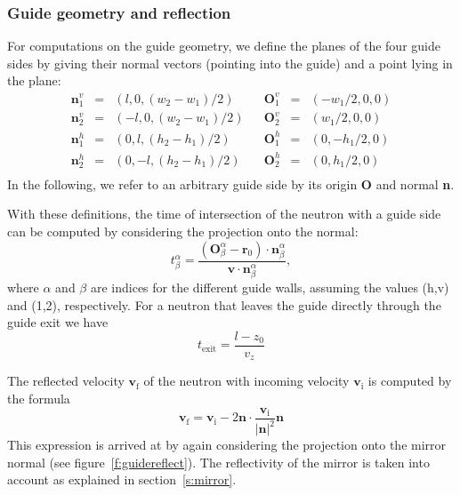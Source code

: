 \subsubsection{Guide geometry and reflection}
For computations on the guide geometry, we define the planes of the four
guide sides by giving their normal vectors (pointing into the guide)
and a point lying in the plane:
$$
\begin{array}{rclcrcl}
\textbf{n}^v_1 &=& (l, 0, {(w_2 - w_1) / 2})
     & & \textbf{O}^v_1 &=& (- w_1 / 2, 0, 0) \\
\textbf{n}^v_2 &=& (-l, 0, {(w_2 - w_1) / 2})
     & & \textbf{O}^v_2 &=& (w_1 / 2, 0, 0) \\
\textbf{n}^h_1 &=& (0, l, {(h_2 - h_1) / 2})
     & & \textbf{O}^h_1 &=& (0, - h_1 / 2, 0) \\
\textbf{n}^h_2 &=& (0, -l, {(h_2 - h_1) / 2})
     & & \textbf{O}^h_2 &=& (0, h_1 / 2, 0) \\
\end{array}
$$
In the following, we refer to an arbitrary guide side by its origin
\textbf{O} and normal \textbf{n}.

With these definitions, the time of intersection of the neutron with a
guide side can be computed by considering the projection onto the
normal:
\begin{equation}
t^\alpha_\beta = \frac{(\textbf{O}^\alpha_\beta - \textbf{r}_0) \cdot \textbf{n}^\alpha_\beta}
  {\textbf{v} \cdot \textbf{n}^\alpha_\beta}  ,
\end{equation}
where $\alpha$ and $\beta$ are indices for the different guide walls,
assuming the values (h,v) and (1,2), respectively.
For a neutron that leaves the guide directly through the guide exit we have
\begin{equation}
t_\textrm{exit} = \frac{l - z_0}{v_z}
\end{equation}

The reflected velocity $\textbf{v}_\textrm{f}$ of the neutron with incoming velocity
$\textbf{v}_\textrm{i}$ is computed by the formula
\begin{equation}
 \textbf{v}_\textrm{f} =
  \textbf{v}_\textrm{i}
   - 2{\textbf{n} \cdot \frac{\textbf{v}_\textrm{i}}{{|\textbf{n}|^2}} \textbf{n}}
\end{equation}
This expression is arrived at by again considering the projection onto
the mirror normal (see figure~\ref{f:guidereflect}). The reflectivity of the
mirror is taken into account as explained in section~\ref{s:mirror}.

